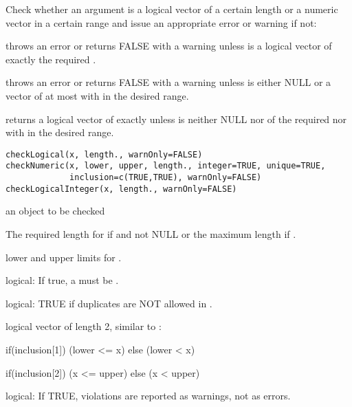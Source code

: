 \begin{Description}\relax
Check whether an argument is a logical vector of a certain length or a
numeric vector in a certain range and issue an appropriate error or
warning if not:

 throws an error or returns FALSE with a warning
unless  is a  logical vector of exactly the required
.

 throws an error or returns FALSE with a warning
unless  is either NULL or a  vector of at most
 with  in the desired range.  

 returns a logical vector of exactly
 unless  is neither NULL nor  of
the required  nor  with  in the
desired range.
\end{Description}
\begin{Usage}
\begin{verbatim}
checkLogical(x, length., warnOnly=FALSE)
checkNumeric(x, lower, upper, length., integer=TRUE, unique=TRUE,
             inclusion=c(TRUE,TRUE), warnOnly=FALSE)
checkLogicalInteger(x, length., warnOnly=FALSE)
\end{verbatim}
\end{Usage}
\begin{Arguments}
\begin{ldescription}
\item[\code{x}] an object to be checked 
\item[\code{length.}] The required length for  if  and not NULL or
the maximum length if .  

\item[\code{lower, upper}] lower and upper limits for .  

\item[\code{integer}] logical:  If true, a   must be
.  

\item[\code{unique}] logical:  TRUE if duplicates are NOT allowed in .  

\item[\code{inclusion}] logical vector of length 2, similar to
:  

if(inclusion[1]) (lower <= x) else (lower < x)

if(inclusion[2]) (x <= upper) else (x < upper)

\item[\code{warnOnly}] logical:  If TRUE, violations are reported as warnings, not as
errors.  

\end{ldescription}
\end{Arguments}
